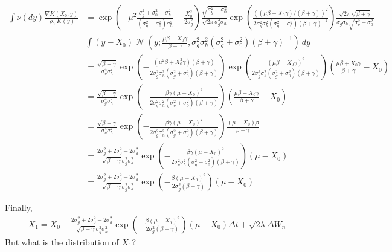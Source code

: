 \documentclass[a4paper]{amsart}
\DeclareMathOperator{\N}{\mathcal{N}}
\begin{document}
\begin{align*}
\int \nu(dy)\frac{\nabla K(X_0, y)}{\varrho_0 K(y)} &= \exp\left( -\mu^2\frac{\sigma_g^2 + \sigma_0^2 - \sigma_h^2}{(\sigma_g^2 + \sigma_0^2)\sigma_h^2} - \frac{X_0^2}{2\sigma_g^2}\right)\frac{\sqrt{\sigma_g^2 + \sigma_0^2}}{\sqrt{2\pi}\sigma_g^3\sigma_h}\exp\left( \frac{\left((\mu \beta + X_0\gamma)/(\beta + \gamma)\right)^2}{2\sigma_g^2\sigma_h^2(\sigma_g^2 + \sigma_0^2)(\beta + \gamma)^{-1}}\right)\frac{\sqrt{2\pi}\sqrt{\beta + \gamma}}{\sigma_g\sigma_h\sqrt{\sigma_g^2 + \sigma_0^2}}\\
&\int (y - X_0)\N\left(y; \frac{\mu \beta + X_0\gamma}{\beta + \gamma}, \sigma_g^2\sigma_h^2(\sigma_g^2 + \sigma_0^2)(\beta + \gamma)^{-1}\right)\ dy\\
&= \frac{\sqrt{\beta + \gamma}}{\sigma_g^4\sigma_h^2}\exp\left( -\frac{(\mu^2\beta + X_0^2\gamma)(\beta + \gamma)}{2\sigma_g^2\sigma_h^2(\sigma_g^2 + \sigma_0^2)(\beta + \gamma)}\right)\exp\left( \frac{\left(\mu \beta + X_0\gamma\right)^2}{2\sigma_g^2\sigma_h^2(\sigma_g^2 + \sigma_0^2)(\beta + \gamma)}\right)\left(\frac{\mu \beta + X_0\gamma}{\beta + \gamma} - X_0\right)\\
&= \frac{\sqrt{\beta + \gamma}}{\sigma_g^4\sigma_h^2}\exp\left( -\frac{\beta\gamma\left(\mu - X_0\right)^2}{2\sigma_g^2\sigma_h^2(\sigma_g^2 + \sigma_0^2)(\beta + \gamma)}\right)\left(\frac{\mu \beta + X_0\gamma}{\beta + \gamma} - X_0\right)\\
&= \frac{\sqrt{\beta + \gamma}}{\sigma_g^4\sigma_h^2}\exp\left(- \frac{\beta\gamma\left(\mu - X_0\right)^2}{2\sigma_g^2\sigma_h^2(\sigma_g^2 + \sigma_0^2)(\beta + \gamma)}\right)\frac{(\mu - X_0)\beta}{\beta + \gamma}\\
&= \frac{2\sigma_g^2 + 2\sigma_0^2 - 2\sigma_h^2}{\sqrt{\beta + \gamma}\sigma_g^2\sigma_h^2}\exp\left(- \frac{\beta\gamma\left(\mu - X_0\right)^2}{2\sigma_g^2\sigma_h^2(\sigma_g^2 + \sigma_0^2)(\beta + \gamma)}\right)(\mu - X_0)\\
&= \frac{2\sigma_g^2 + 2\sigma_0^2 - 2\sigma_h^2}{\sqrt{\beta + \gamma}\sigma_g^2\sigma_h^2}\exp\left(- \frac{\beta\left(\mu - X_0\right)^2}{2\sigma_g^2(\beta + \gamma)}\right)(\mu - X_0)
\end{align*}

Finally,
\begin{align*}
X_1 = X_0 -\frac{2\sigma_g^2 + 2\sigma_0^2 - 2\sigma_h^2}{\sqrt{\beta + \gamma}\sigma_g^2\sigma_h^2}\exp\left(- \frac{\beta\left(\mu - X_0\right)^2}{2\sigma_g^2(\beta + \gamma)}\right)(\mu - X_0) \Delta t + \sqrt{2\lambda}\Delta W_n
\end{align*}
But what is the distribution of $X_1$?
\end{document}
